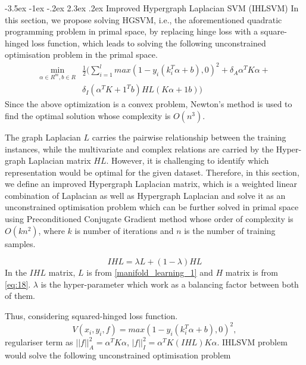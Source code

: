 \documentclass[12pt,a4paper,oneside,english]{report}
\makeatletter
\renewcommand\section{\@startsection {section}{1}{\z@}%
                                   {-3.5ex \@plus -1ex \@minus -.2ex}%
                                   {2.3ex \@plus.2ex}%
                                   {\centering\normalfont\LARGE\bfseries}}
\makeatother
\begin{document}
\section{Improved Hypergraph Laplacian SVM (IHLSVM)}
In this section, we propose solving HGSVM, i.e., the aforementioned quadratic programming problem in primal space, by replacing hinge loss with a square-hinged loss function, which leads to solving the following unconstrained optimisation problem in the primal space.
\begin{equation} \label{eq:16}
	\begin{split}
		\underset{\alpha \in R^m,b \in R}{\mathrm{min} } & \frac{1}{2}(\sum_{i=1}^l max(1-y_i(k_i^T\alpha + b),0)^2 + \delta_A\alpha^TK\alpha + \\  
		& \delta_I(\alpha^TK + 1^Tb)HL(K\alpha + 1b))
	\end{split}
\end{equation}
Since the above optimization  is a convex problem, Newton's method is used to find the optimal solution whose complexity is $O(n^3)$. 

The graph Laplacian \(L\) carries the pairwise relationship between the training instances, while the multivariate and complex relations are carried by the Hyper-graph Laplacian matrix \(HL\). However, it is challenging to identify which representation would be optimal for the given dataset. Therefore, in this section, we define an improved Hypergraph Laplacian matrix, which is a weighted linear combination of Laplacian as well as Hypergraph Laplacian and solve it as an unconstrained optimisation problem which can be further solved in primal space using Preconditioned Conjugate Gradient method \cite{melacci2011laplacian} whose order of complexity is $O(kn^2)$, where $k$ is number of iterations and $n$ is the number of training samples.

\begin{equation} \label{eq:18}
    IHL = \lambda L + (1-\lambda) HL
\end{equation}
In the \(IHL\) matrix, \(L\) is from \eqref{manifold_learning_1} and \(H\) matrix is from \eqref{eq:18}. $\lambda$ is the hyper-parameter which work as a balancing factor between both of them. 

Thus, considering squared-hinged loss function.
\[
V(x_i,y_i,f) = max(1-y_i(k_i^T\alpha + b),0)^2,
\] regulariser term as 
\(||f||^2_A = \alpha^T K \alpha\), \(|f||^2_I = \alpha^T K (IHL) K \alpha\).  IHLSVM problem would solve the following unconstrained optimisation problem
\end{document}
